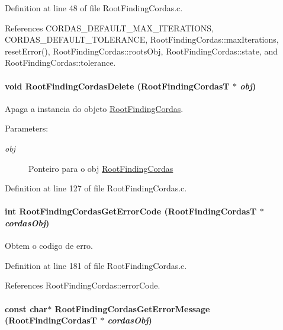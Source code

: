 Definition at line 48 of file RootFindingCordas.c.

References CORDAS\_\-DEFAULT\_\-MAX\_\-ITERATIONS, CORDAS\_\-DEFAULT\_\-TOLERANCE, RootFindingCordas::maxIterations, resetError(), RootFindingCordas::rootsObj, RootFindingCordas::state, and RootFindingCordas::tolerance.\hypertarget{group____cordas_g1b42f5cdb8c787c44539b6e0de8d968f}{
\paragraph[RootFindingCordasDelete]{\setlength{\rightskip}{0pt plus 5cm}void RootFindingCordasDelete ({\bf RootFindingCordasT} $\ast$ {\em obj})}\hfill}
\label{group____cordas_g1b42f5cdb8c787c44539b6e0de8d968f}


Apaga a instancia do objeto \hyperlink{structRootFindingCordas}{RootFindingCordas}. 

\begin{Desc}
\item[Parameters:]
\begin{description}
\item[{\em obj}]Ponteiro para o obj \hyperlink{structRootFindingCordas}{RootFindingCordas} \end{description}
\end{Desc}


Definition at line 127 of file RootFindingCordas.c.\hypertarget{group____cordas_gcc4b8454f6664e389c484498f42c17d8}{
\paragraph[RootFindingCordasGetErrorCode]{\setlength{\rightskip}{0pt plus 5cm}int RootFindingCordasGetErrorCode ({\bf RootFindingCordasT} $\ast$ {\em cordasObj})}\hfill}
\label{group____cordas_gcc4b8454f6664e389c484498f42c17d8}


Obtem o codigo de erro. 



Definition at line 181 of file RootFindingCordas.c.

References RootFindingCordas::errorCode.\hypertarget{group____cordas_g5a6750a998093e1701c8a01ae24e9cc2}{
\paragraph[RootFindingCordasGetErrorMessage]{\setlength{\rightskip}{0pt plus 5cm}const char$\ast$ RootFindingCordasGetErrorMessage ({\bf RootFindingCordasT} $\ast$ {\em cordasObj})}\hfill}
\label{group____cordas_g5a6750a998093e1701c8a01ae24e9cc2}



